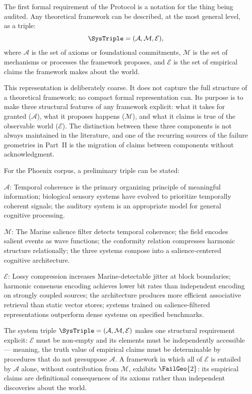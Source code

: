 The first formal requirement of the \Ortyx{} Protocol is
a notation for the thing being audited. Any theoretical
framework can be described, at the most general level,
as a triple:
\[
  \SysTriple = (\mathcal{A}, \mathcal{M}, \mathcal{E}),
\]
where $\mathcal{A}$ is the set of axioms or foundational
commitments, $\mathcal{M}$ is the set of mechanisms or
processes the framework proposes, and $\mathcal{E}$ is
the set of empirical claims the framework makes about
the world.

This representation is deliberately coarse. It does not
capture the full structure of a theoretical framework;
no compact formal representation can. Its purpose is
to make three structural features of any framework
explicit: what it takes for granted ($\mathcal{A}$),
what it proposes happens ($\mathcal{M}$), and what it
claims is true of the observable world ($\mathcal{E}$).
The distinction between these three components is not
always maintained in the literature, and one of the
recurring sources of the failure geometries in Part~II
is the migration of claims between components without
acknowledgment.

For the Phoenix corpus, a preliminary triple can be stated:

$\mathcal{A}$: Temporal coherence is the primary organizing
principle of meaningful information; biological sensory
systems have evolved to prioritize temporally coherent
signals; the auditory system is an appropriate model
for general cognitive processing.

$\mathcal{M}$: The Marine salience filter detects temporal
coherence; the \MEMeight{} field encodes salient events
as wave functions; the \HCFone{} conformity relation
compresses harmonic structure relationally; the three
systems compose into a salience-centered cognitive
architecture.

$\mathcal{E}$: Lossy compression increases Marine-detectable
jitter at block boundaries; harmonic consensus encoding
achieves lower bit rates than independent encoding on
strongly coupled sources; the \MEMeight{} architecture
produces more efficient associative retrieval than
static vector stores; systems trained on salience-filtered
representations outperform dense systems on specified
benchmarks.

\begin{technote}
The system triple $\SysTriple = (\mathcal{A}, \mathcal{M},
\mathcal{E})$ makes one structural requirement explicit:
$\mathcal{E}$ must be non-empty and its elements must
be independently accessible --- meaning, the truth value
of empirical claims must be determinable by procedures
that do not presuppose $\mathcal{A}$. A framework in
which all of $\mathcal{E}$ is entailed by $\mathcal{A}$
alone, without contribution from $\mathcal{M}$, exhibits
$\FailGeo{2}$: its empirical claims are definitional
consequences of its axioms rather than independent
discoveries about the world.
\end{technote}

